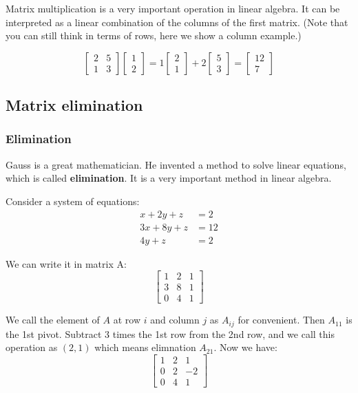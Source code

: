 \documentclass[12pt]{ctexart}
\begin{document}
Matrix multiplication is a very important operation in linear algebra. It can be
interpreted as a linear combination of the columns of the first matrix. (Note that you
can still think in terms of rows, here we show a column example.)

\[
  \begin{bmatrix} 2 & 5 \\ 1 & 3 \end{bmatrix}
  \begin{bmatrix} 1 \\ 2 \end{bmatrix}
  =
  1 \begin{bmatrix} 2 \\ 1 \end{bmatrix} +
  2 \begin{bmatrix} 5 \\ 3 \end{bmatrix}
  =
  \begin{bmatrix} 12 \\7 \end{bmatrix}
\]

\subsection{\textbf{Matrix elimination}}
\subsubsection{\textbf{Elimination}}

Gauss is a great mathematician. He invented a method to solve linear equations, which is
called \textbf{elimination}. It is a very important method in linear algebra.

Consider a system of equations:
\begin{equation}
    \begin{aligned}
        x + 2y + z &= 2 \\
        3x + 8y + z &= 12 \\
        4y + z &= 2
    \end{aligned}
\end{equation}

We can write it in matrix A:
\[
  \begin{bmatrix}
    1 & 2 & 1 \\
    3 & 8 & 1 \\
    0 & 4 & 1
  \end{bmatrix}
\]

We call the element of $A$ at row $i$ and column $j$ as $A_{ij}$ for convenient. Then
$A_{11}$ is the 1st pivot. Subtract 3 times the 1st row from the 2nd row, and we call
this operation as $(2, 1)$ which means elimnation $A_{21}$. Now we have:
\[
  \begin{bmatrix}
    1 & 2 & 1 \\
    0 & 2 & -2 \\
    0 & 4 & 1
  \end{bmatrix}
\]
\end{document}
